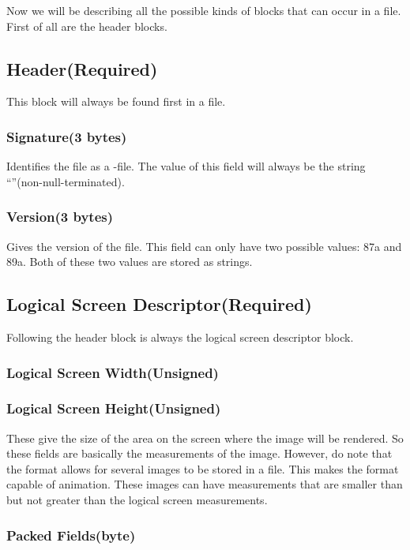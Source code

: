Now we will be describing all the possible kinds of blocks that can
occur in a \gif file. First of all are the header blocks.

\subsection{Header(Required)}

This block will always be found first in a \gif file.

\subsubsection*{Signature(3 bytes)}

Identifies the file as a \gif-file. The value of this field will always
be the \ascii string ``\gif''(non-null-terminated).

\subsubsection{Version(3 bytes)}

Gives the version of the \gif file. This field can only have two
possible values: 87a and 89a. Both of these two values are stored as
\ascii strings.

\subsection{Logical Screen Descriptor(Required)}

Following the header block is always the logical screen descriptor
block.

\subsubsection{Logical Screen Width(Unsigned)}
\subsubsection{Logical Screen Height(Unsigned)}

These give the size of the area on the screen where the image will be
rendered. So these fields are basically the measurements of the
image. However, do note that the \gif format allows for several images
to be stored in a \gif file. This makes the \gif format capable of
animation. These images can have measurements that are smaller than
but not greater than the logical screen measurements.

\subsubsection{Packed Fields(byte)}

